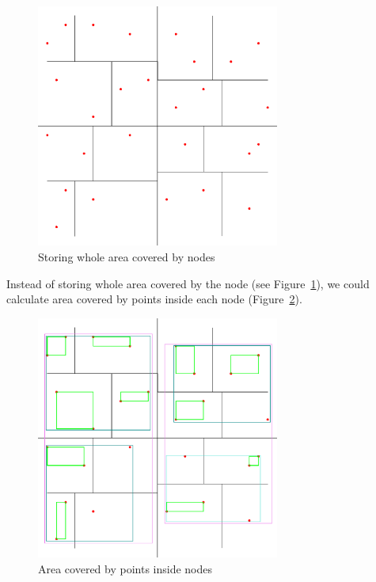 \documentclass[10pt,a4paper]{article}
\begin{document}
\begin{figure}
\centering
  \includegraphics[width=8cm]{Figure1}
  \caption{Storing whole area covered by nodes}
  \label{fig:covered}
\end{figure}

Instead of storing whole area covered by the node (see Figure~\ref{fig:covered}), we could calculate area covered by points inside each node (Figure~\ref{fig:inside}).

\begin{figure}
\centering
  \includegraphics[width=8cm]{Figure2}
  \caption{Area covered by points inside nodes}
  \label{fig:inside}
\end{figure}
\end{document}
